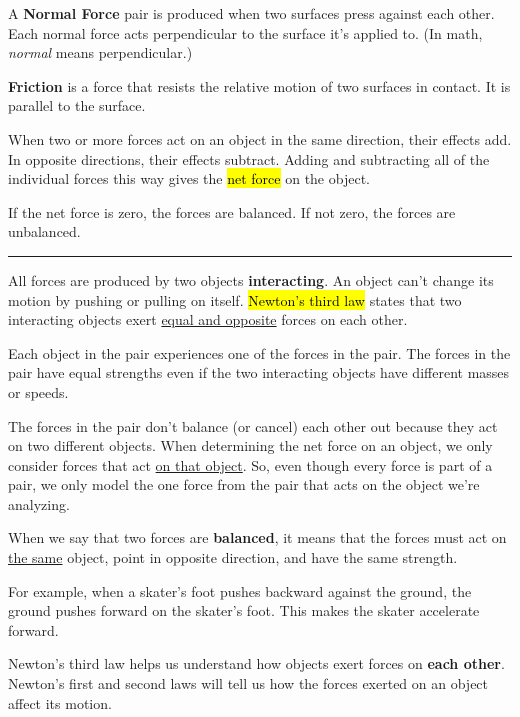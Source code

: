 A \textbf{Normal Force} pair is produced when two surfaces press against each other. Each normal force acts perpendicular to the surface it’s applied to. (In math, \textit{normal} means perpendicular.)

\textbf{Friction} is a force that resists the relative motion of two surfaces in contact. It is parallel to the surface.

\vspace{.5cm}

When two or more forces act on an object in the same direction, their effects add. In opposite directions, their effects subtract. Adding and subtracting all of the individual forces this way gives the \hl{net force} on the object.

If the net force is zero, the forces are balanced. If not zero, the forces are unbalanced.

\noindent\rule{\textwidth}{0.4pt}

All forces are produced by two objects \textbf{interacting}. An object can’t change its motion by pushing or pulling on itself. \hl{Newton's third law} states that two interacting objects exert \underline{equal and opposite} forces on each other.

Each object in the pair experiences one of the forces in the pair. The forces in the pair have equal strengths even if the two interacting objects have different masses or speeds.

The forces in the pair don't balance (or cancel) each other out because they act on two different objects. When determining the net force on an object, we only consider forces that act \underline{on that object}. So, even though every force is part of a pair, we only model the one force from the pair that acts on the object we're analyzing.

When we say that two forces are \textbf{balanced}, it means that the forces must act on \underline{the same} object, point in opposite direction, and have the same strength.

For example, when a skater’s foot pushes backward against the ground, the ground pushes forward on the skater’s foot. This makes the skater accelerate forward.

\vspace{.5cm}

Newton's third law helps us understand how objects exert forces on \textbf{each other}. Newton's first and second laws will tell us how the forces exerted on an object affect its motion. 

